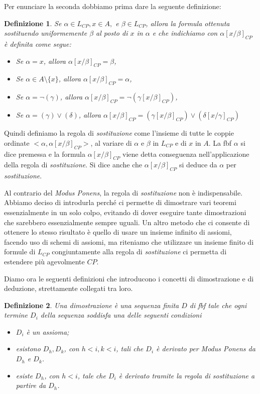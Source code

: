 \documentclass[a4paper, titlepage, 12pt]{report}
\newtheorem{definition}{Definizione}[chapter]
\begin{document}
Per enunciare la seconda dobbiamo prima dare la seguente definizione:
\begin{definition}
Se $\alpha \in L_{CP}, x \in A,$ e $\beta \in L_{CP}$, allora la formula
ottenuta sostituendo uniformemente $\beta$ al posto di $x$ in $\alpha$
e che indichiamo con $\alpha[x/\beta]_{CP}$ è definita come segue:
\begin{itemize}
\item Se $\alpha = x$, allora $\alpha[x/\beta]_{CP} = \beta$,
\item Se $\alpha \in A \setminus \{x\}$, allora $\alpha[x/\beta]_{CP} = \alpha$,
\item Se $\alpha = \neg (\gamma)$, allora $\alpha[x/\beta]_{CP} = \neg (\gamma[x/\beta]_{CP})$,
\item Se $\alpha = (\gamma) \lor (\delta)$,
      allora $\alpha[x/\beta]_{CP} = (\gamma[x/\beta]_{CP}) \lor (\delta[x/\gamma]_{CP})$
\end{itemize}
\end{definition}

Quindi definiamo la regola di \emph{sostituzione} come l'insieme
di tutte le coppie ordinate $<\alpha, \alpha[x/\beta]_{CP}>$, al variare di
$\alpha$ e $\beta$ in $L_{CP}$ e di $x$ in $A$.
La fbf $\alpha$ si dice premessa e la formula $\alpha[x/\beta]_{CP}$ viene detta conseguenza
nell'applicazione della regola di \emph{sostituzione}.
Si dice anche che $\alpha[x/\beta]_{CP}$ si deduce da $\alpha$ per \emph{sostituzione}.

Al contrario del \emph{Modus Ponens},
la regola di \emph{sostituzione} non è indispensabile. Abbiamo deciso di introdurla
perché ci permette di dimostrare vari teoremi essenzialmente in un solo colpo,
evitando di dover eseguire tante dimostrazioni che sarebbero essenzialmente sempre uguali.
Un altro metodo che ci consente di ottenere lo stesso risultato
è quello di usare un insieme infinito
di assiomi, facendo uso di schemi di assiomi, ma riteniamo che utilizzare un insieme
finito di formule di $L_{CP}$ congiuntamente alla regola di \emph{sostituzione}
ci permetta di estendere più agevolmente $CP$.

Diamo ora le seguenti definizioni che introducono i concetti di dimostrazione e di
deduzione, strettamente collegati tra loro.

\begin{definition}
Una dimostrazione è una sequenza finita $D$ di fbf tale che
ogni termine $D_i$ della sequenza soddisfa una delle seguenti condizioni
\begin{itemize}
\item $D_i$ è un assioma;
\item esistono $D_h, D_k$, con $h < i, k < i$, tali che $D_i$ è derivato per \emph{Modus Ponens}
da $D_h$ e $D_k$.
\item esiste $D_h$, con $h < i$, tale che $D_i$ è derivato tramite
la regola di \emph{sostituzione} a partire da $D_h$.
\end{itemize}
\end{definition}
\end{document}
